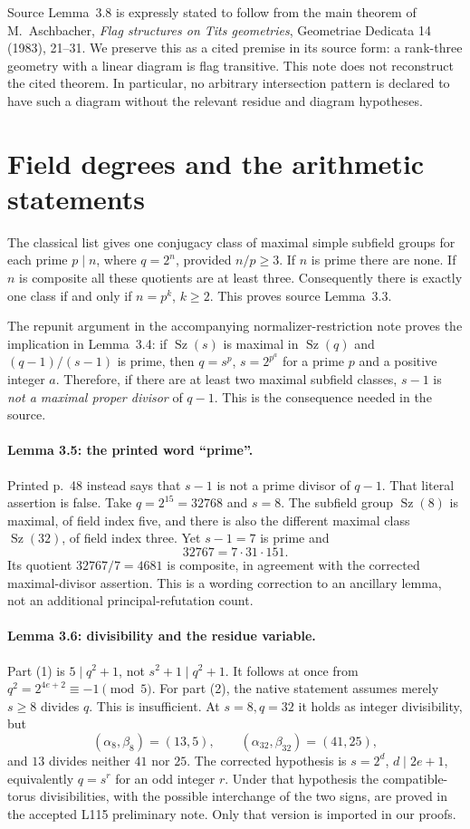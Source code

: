 \documentclass[11pt,a4paper]{article}
\newcommand{\Sz}{\operatorname{Sz}}
\begin{document}
Source Lemma~3.8 is expressly stated to follow from the main theorem
of M.~Aschbacher, \emph{Flag structures on Tits geometries}, Geometriae
Dedicata 14 (1983), 21--31. We preserve this as a cited premise in its
source form: a rank-three geometry with a linear diagram is flag
transitive. This note does not reconstruct the cited theorem. In particular,
no arbitrary intersection pattern is declared to have such a diagram
without the relevant residue and diagram hypotheses.

\section{Field degrees and the arithmetic statements}
The classical list gives one conjugacy class of maximal simple subfield
groups for each prime $p\mid n$, where $q=2^n$, provided $n/p\ge3$.
If $n$ is prime there are none. If $n$ is composite all these quotients
are at least three. Consequently there is exactly one class if and only
if $n=p^k$, $k\ge2$. This proves source Lemma~3.3.

The repunit argument in the accompanying normalizer-restriction note
proves the implication in Lemma~3.4: if $\Sz(s)$ is maximal in $\Sz(q)$
and $(q-1)/(s-1)$ is prime, then $q=s^p$, $s=2^{p^a}$ for a prime
$p$ and a positive integer $a$. Therefore, if there are at least two
maximal subfield classes, $s-1$ is \emph{not a maximal proper divisor}
of $q-1$. This is the consequence needed in the source.

\paragraph{Lemma 3.5: the printed word ``prime''.}
Printed p.~48 instead says that $s-1$ is not a prime divisor of $q-1$.
That literal assertion is false. Take $q=2^{15}=32768$ and $s=8$.
The subfield group $\Sz(8)$ is maximal, of field index five, and there
is also the different maximal class $\Sz(32)$, of field index three.
Yet $s-1=7$ is prime and
\[
 32767=7\cdot31\cdot151.
\]
Its quotient $32767/7=4681$ is composite, in agreement with the corrected
maximal-divisor assertion. This is a wording correction to an ancillary
lemma, not an additional principal-refutation count.

\paragraph{Lemma 3.6: divisibility and the residue variable.}
Part (1) is $5\mid q^2+1$, not $s^2+1\mid q^2+1$.
It follows at once from $q^2=2^{4e+2}\equiv-1\pmod5$.
For part (2), the native statement assumes merely $s\ge8$ divides $q$.
This is insufficient. At $s=8,q=32$ it holds as integer divisibility,
but
\[
 (\alpha_8,\beta_8)=(13,5),\qquad
 (\alpha_{32},\beta_{32})=(41,25),
\]
and $13$ divides neither $41$ nor $25$. The corrected hypothesis is
$s=2^d$, $d\mid 2e+1$, equivalently $q=s^r$ for an odd integer $r$.
Under that hypothesis the compatible-torus divisibilities, with the
possible interchange of the two signs, are proved in the accepted L115
preliminary note. Only that version is imported in our proofs.
\end{document}

